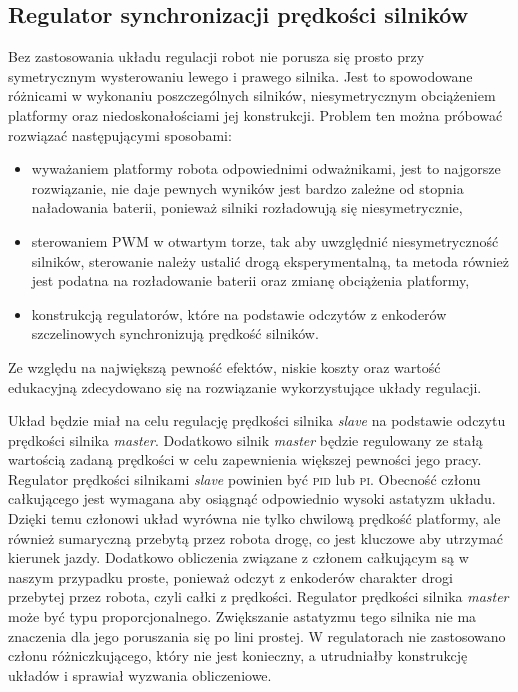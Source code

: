 \documentclass[11pt]{article}
\begin{document}
\subsection{Regulator synchronizacji prędkości silników}
Bez zastosowania układu regulacji robot nie porusza się prosto przy symetrycznym wysterowaniu lewego i prawego silnika.
Jest to spowodowane różnicami w wykonaniu poszczególnych silników, niesymetrycznym obciążeniem platformy oraz niedoskonałościami jej konstrukcji.
Problem ten można próbować rozwiązać następującymi sposobami:
\begin{itemize}
	\item wyważaniem platformy robota odpowiednimi odważnikami, jest to najgorsze rozwiązanie, nie daje pewnych wyników jest bardzo zależne od stopnia naładowania baterii, ponieważ silniki rozładowują się niesymetrycznie,
	\item sterowaniem PWM w otwartym torze, tak aby uwzględnić niesymetryczność silników, sterowanie należy ustalić drogą eksperymentalną, ta metoda również jest podatna na rozładowanie baterii oraz zmianę obciążenia platformy,
	\item konstrukcją regulatorów, które na podstawie odczytów z enkoderów szczelinowych synchronizują prędkość silników.
\end{itemize}

Ze względu na największą pewność efektów, niskie koszty oraz wartość edukacyjną zdecydowano się na rozwiązanie wykorzystujące układy regulacji.


Układ będzie miał na celu regulację prędkości silnika \textit{slave} na podstawie odczytu prędkości silnika \textit{master}. Dodatkowo silnik \textit{master} będzie regulowany ze stałą wartością zadaną prędkości w celu zapewnienia większej pewności jego pracy.
Regulator prędkości silnikami \textit{slave} powinien być \textsc{pid} lub \textsc{pi}.
Obecność członu całkującego jest wymagana aby osiągnąć odpowiednio wysoki astatyzm układu.
Dzięki temu członowi układ wyrówna nie tylko chwilową prędkość platformy, ale również sumaryczną przebytą przez robota drogę, co jest kluczowe aby utrzymać kierunek jazdy.
Dodatkowo obliczenia związane z członem całkującym są w naszym przypadku proste, ponieważ odczyt z enkoderów charakter drogi przebytej przez robota, czyli całki z prędkości.
Regulator prędkości silnika \textit{master} może być typu proporcjonalnego.
Zwiększanie astatyzmu tego silnika nie ma znaczenia dla jego poruszania się po lini prostej.
W regulatorach nie zastosowano członu różniczkującego, który nie jest konieczny, a utrudniałby konstrukcję układów i sprawiał wyzwania obliczeniowe.
\end{document}
